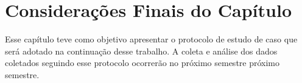 \section{Considerações Finais do Capítulo} 

Esse capítulo teve como objetivo apresentar o protocolo de estudo de caso que será adotado na continuação desse trabalho. A coleta e análise dos dados coletados seguindo esse protocolo ocorrerão no próximo semestre próximo semestre.

\label{estudo de caso}

